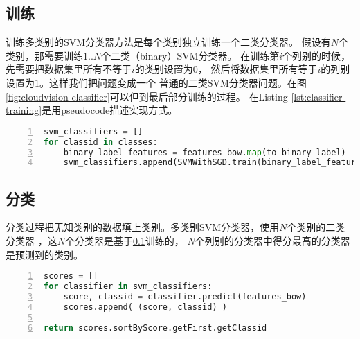 \subsection{训练}
\label{subsec:classifier-training}
训练多类别的SVM分类器方法是每个类别独立训练一个二类分类器。
假设有$N$个类别，那需要训练$1..N$个二类（binary）SVM分类器。
在训练第$i$个列别的时候，先需要把数据集里所有不等于$i$的类别设置为$0$，
然后将数据集里所有等于$i$的列别设置为$1$。这样我们把问题变成一个
普通的二类SVM分类器问题。在图\ref{fig:cloudvision-classifier}可以但到最后部分训练的过程。
在Listing \ref{lst:classifier-training}是用pseudocode描述实现方式。
\begin{lstlisting}[language=Python,
                   basicstyle=\small,
                   numbers=left,
                   showstringspaces=false,
                   caption={SVM多类别分类器训练pseudocode},
                   label={lst:classifier-training}]
svm_classifiers = []
for classid in classes:
    binary_label_features = features_bow.map(to_binary_label)
    svm_classifiers.append(SVMWithSGD.train(binary_label_features))
\end{lstlisting}



\subsection{分类}
\label{subsec:classifier-label}
分类过程把无知类别的数据填上类别。多类别SVM分类器，使用$N$个类别的二类分类器
，这$N$个分类器是基于\ref{subsec:classifier-training}训练的，
$N$个列别的分类器中得分最高的分类器是预测到的类别。
\begin{lstlisting}[language=Python,
                   basicstyle=\small,
                   numbers=left,
                   showstringspaces=false,
                   caption={SVM多类别分类器分类pseudocode},
                   label={lst:classifier-training}]
scores = []
for classifier in svm_classifiers:
    score, classid = classifier.predict(features_bow)
    scores.append( (score, classid) )

return scores.sortByScore.getFirst.getClassid
\end{lstlisting}




